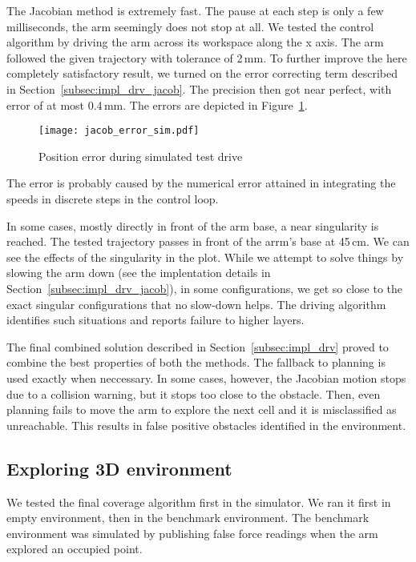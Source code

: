 \documentclass[buriama8_dp.tex]{subfiles}
\begin{document}
The Jacobian method is extremely fast. The pause at each step is only a few milliseconds, the arm seemingly does not stop at all. We tested the control algorithm by driving the arm across its workspace along the \m x axis. The arm followed the given trajectory with tolerance of 2\,mm. To further improve the here completely satisfactory result, we turned on the error correcting term described in Section~\ref{subsec:impl_drv_jacob}. The precision then got near perfect, with error of at most 0.4\,mm. The errors are depicted in Figure~\ref{fig:err_jac_sim}. 

\begin{figure}[ht]
  \centering
  \texttt{[image: jacob\_error\_sim.pdf]}
  \caption{Position error during simulated test drive}
  \label{fig:err_jac_sim}
\end{figure}

The error is probably caused by the numerical error attained in integrating the speeds in discrete steps in the control loop.

In some cases, mostly directly in front of the arm base, a near singularity is reached. The tested trajectory passes in front of the arrm's base at 45\,cm. We can see the effects of the singularity in the plot. While we attempt to solve things by slowing the arm down (see the implentation details in Section~\ref{subsec:impl_drv_jacob}), in some configurations, we get so close to the exact singular configurations that no slow-down helps. The driving algorithm identifies such situations and reports failure to higher layers.

The final combined solution described in Section~\ref{subsec:impl_drv} proved to combine the best properties of both the methods. The fallback to planning is used exactly when neccessary. In some cases, however, the Jacobian motion stops due to a collision warning, but it stops too close to the obstacle. Then, even planning fails to move the arm to explore the next cell and it is misclassified as unreachable. This results in false positive obstacles identified in the environment.

\subsection{Exploring 3D environment}
\label{subsec:sim_arm_cover}

We tested the final coverage algorithm first in the simulator. We ran it first in empty environment, then in the benchmark environment. The benchmark environment was simulated by publishing false force readings when the arm explored an occupied point.
\end{document}
